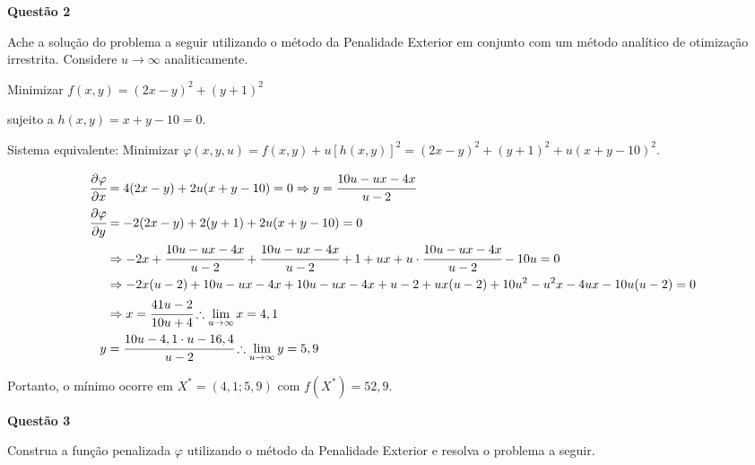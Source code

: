 \documentclass{rbfin}
\begin{document}
\vspace{6mm}

\large

\textbf{Questão 2}

\normalsize

\vspace{6mm}

\doublespacing

Ache a solução do problema a seguir utilizando o método da Penalidade Exterior
em conjunto com um método analítico de otimização irrestrita. Considere $u\to \infty$
analiticamente.

Minimizar $f(x,y) = (2x-y)^2+(y+1)^2$

sujeito a $h(x,y) = x+y - 10 = 0$.

Sistema equivalente: Minimizar $\varphi(x,y,u) = f(x,y) + u [h(x,y)]^2 = (2x-y)^2+(y+1)^2 + u (x+y - 10)^2$.

\begin{align*}
\cfrac{\partial \varphi}{\partial x} &= 4(2x-y) + 2u(x+y - 10) = 0 \Rightarrow y = \cfrac{10u - ux - 4x}{u - 2}\\
\cfrac{\partial \varphi}{\partial y} &= -2(2x-y) + 2(y+1) + 2u (x+y - 10) = 0\\
&\Rightarrow - 2x + \cfrac{10u - ux - 4x}{u - 2} + \cfrac{10u - ux - 4x}{u - 2}+1 + ux+ u\cdot \cfrac{10u - ux - 4x}{u - 2} - 10u = 0\\
&\Rightarrow - 2x(u - 2) + 10u - ux - 4x + 10u - ux - 4x + u - 2 + ux(u - 2) + 10u^2 - u^2x - 4ux - 10u(u - 2) = 0\\
&\Rightarrow x = \cfrac{41u - 2}{10u + 4} \therefore \lim_{u \to \infty} x = 4,1\\
y &= \cfrac{10u - 4,1 \cdot u - 16,4}{u - 2} \therefore \lim_{u \to \infty} y = 5,9
\end{align*}

Portanto, o mínimo ocorre em $X^* = (4,1;5,9)$ com $f(X^*) = 52,9$.

\singlespacing

\vspace{6mm}

\large

\textbf{Questão 3}

\normalsize

\vspace{6mm}

\doublespacing

Construa a função penalizada $\varphi$ utilizando o método da Penalidade Exterior e
resolva o problema a seguir.
\end{document}
